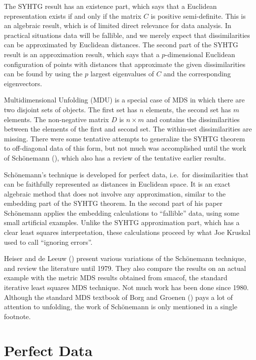 \documentclass[
  12pt,
  letterpaper,
  DIV=11,
  numbers=noendperiod]{scrartcl}
\begin{document}
The SYHTG result has an existence part, which says that a Euclidean
representation exists if and only if the matrix \(C\) is positive
semi-definite. This is an algebraic result, which is of limited direct
relevance for data analysis. In practical situations data will be
fallible, and we merely expect that dissimilarities can be approximated
by Euclidean distances. The second part of the SYHTG result is an
approximation result, which says that a \(p\)-dimensional Euclidean
configuration of points with distances that approximate the given
dissimilarities can be found by using the \(p\) largest eigenvalues of
\(C\) and the corresponding eigenvectors.

Multidimensional Unfolding (MDU) is a special case of MDS in which there
are two disjoint sets of objects. The first set has \(n\) elements, the
second set has \(m\) elements. The non-negative matrix \(D\) is
\(n \times m\) and contains the dissimilarities between the elements of
the first and second set. The within-set dissimilarities are missing.
There were some tentative attempts to generalize the SYHTG theorem to
off-diagonal data of this form, but not much was accomplished until the
work of Schönemann (), which also has
a review of the tentative earlier results.

Schönemann's technique is developed for perfect data, i.e.~for
dissimilarities that can be faithfully represented as distances in
Euclidean space. It is an exact algebraic method that does not involve
any approximation, similar to the embedding part of the SYHTG theorem.
In the second part of his paper Schönemann applies the embedding
calculations to ``fallible'' data, using some small artificial examples.
Unlike the SYHTG approximation part, which has a clear least squares
interpretation, these calculations proceed by what Joe Kruskal used to
call ``ignoring errors''.

{Heiser and de Leeuw} () present
various variations of the Schönemann technique, and review the
literature until 1979. They also compare the results on an actual
example with the metric MDS results obtained from smacof, the standard
iterative least squares MDS technique. Not much work has been done since
1980. Although the standard MDS textbook of Borg and Groenen
() pays a lot of attention to
unfolding, the work of Schönemann is only mentioned in a single
footnote.

\section{Perfect Data}\label{perfect-data}
\end{document}
